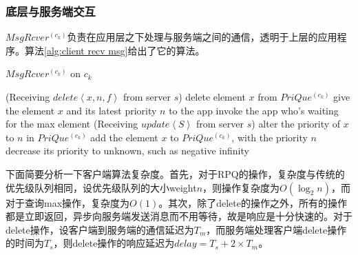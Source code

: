 		\subsubsection{底层与服务端交互}
			\par $MsgRcver^{(c_{k})}$负责在应用层之下处理与服务端之间的通信，透明于上层的应用程序。算法\ref{alg:client recv msg}给出了它的算法。
			\begin{algorithm}	
				\caption{$MsgRcver^{(c_{k})}$ on $c_k$}
				\label{alg:client recv msg}
				\Begin(Receiving $delete\left\langle x,n,f\right\rangle $ from server $s$)
				{
					{
						delete element $x$ from $PriQue^{(c_{k})}$\;
					}
					{
						give the element $x$ and its latest priority $n$ to the app\;
						invoke the app who's waiting for the max element\;
					}
				}
				\Begin(Receiving $update\left\langle S\right\rangle $ from server $s$)
				{
					{
						{
							alter the priority of $x$ to $n$ in $PriQue^{(c_{k})}$\;
						}
						\Else
						{
							add the element $x$ to $PriQue^{(c_{k})}$, with the priority $n$\;
						}
					}
					{
						decrease its priority to unknown, such as negative infinity\;
					}
				}
			\end{algorithm}
			\par 下面简要分析一下客户端算法复杂度。首先，对于RPQ的操作，复杂度与传统的优先级队列相同，设优先级队列的大小weight$n$，则操作复杂度为$O(\log_2 n)$，而对于查询max操作，复杂度为$O(1)$。其次，除了delete的操作之外，所有的操作都是立即返回，异步向服务端发送消息而不用等待，故是响应是十分快速的。对于delete操作，设客户端到服务端的通信延迟为$T_m$，而服务端处理客户端delete操作的时间为$T_s$，则delete操作的响应延迟为$delay=T_s+2\times T_m$。
